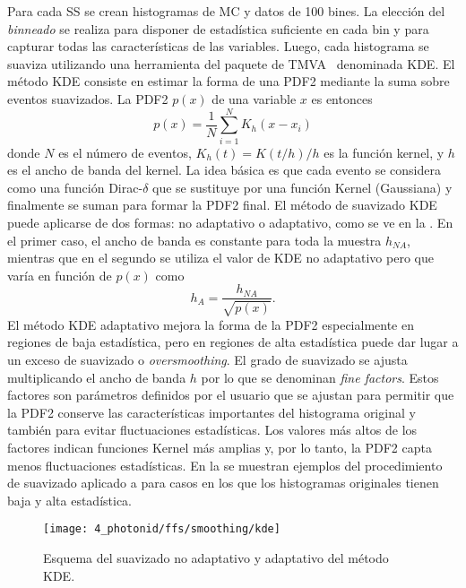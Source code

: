 Para cada \ac{SS} se crean histogramas de \ac{MC} y datos de 100 bines. La elección del \textit{binneado} se realiza para disponer de estadística suficiente en cada bin y para capturar todas las características de las variables.
Luego, cada histograma se suaviza utilizando una herramienta del paquete de TMVA~\cite{TMVA} denominada \acf{KDE}. El método \ac{KDE} consiste en estimar la forma de una \acf{PDF2} mediante la suma sobre eventos suavizados. La \ac{PDF2} \(p(x)\) de una variable \(x\) es entonces
\begin{equation*}
	p(x) = \frac{1}{N}\sum_{i=1}^{N} K_h(x-x_i)
\end{equation*}
donde \(N\) es el número de eventos, \(K_h(t) = K(t/h)/h\) es la función kernel, y \(h\) es el ancho de banda del kernel. La idea básica es que cada evento se considera como una función Dirac-\(\delta\) que se sustituye por una función Kernel (Gaussiana) y finalmente se suman para formar la \ac{PDF2} final. El método de suavizado \ac{KDE} puede aplicarse de dos formas: no adaptativo o adaptativo, como se ve en la \Fig{\ref{fig:ss_corrections:ffs:calculation:adaptive_nonadaptive_kde}}. En el primer caso, el ancho de banda es constante para toda la muestra \(h_{NA}\), mientras que en el segundo se utiliza el valor de \ac{KDE} no adaptativo pero que varía en función de \(p(x)\) como
\begin{equation*}
	h_A = \frac{h_{NA}}{\sqrt{p(x)}}.
\end{equation*}
El método \ac{KDE} adaptativo mejora la forma de la \ac{PDF2} especialmente en regiones de baja estadística, pero en regiones de alta estadística puede dar lugar a un exceso de suavizado o \textit{oversmoothing}. El grado de suavizado se ajusta multiplicando el ancho de banda \(h\) por lo que se denominan \textit{fine factors}.
Estos factores son parámetros definidos por el usuario que se ajustan para permitir que la \ac{PDF2} conserve las características importantes del histograma original y también para evitar fluctuaciones estadísticas. Los valores más altos de los factores indican funciones Kernel más amplias y, por lo tanto, la \ac{PDF2} capta menos fluctuaciones estadísticas.
En la \Fig{\ref{fig:ss_corrections:ffs:calculation:smoothing_ss}} se muestran ejemplos del procedimiento de suavizado aplicado a \rhad para casos en los que los histogramas originales tienen baja y alta estadística.

\begin{figure}[ht!]
    \centering
    \texttt{[image: 4\_photonid/ffs/smoothing/kde]}
    \caption{Esquema del suavizado no adaptativo y adaptativo del método \ac{KDE}.}
    \label{fig:ss_corrections:ffs:calculation:adaptive_nonadaptive_kde}
\end{figure}

